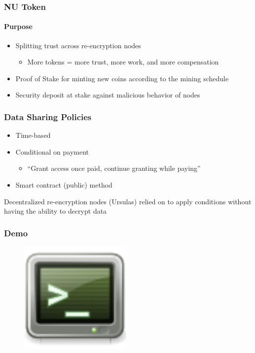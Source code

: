 \documentclass[xetex,mathsans,sans,aspectratio=169]{beamer}
\begin{document}
    \begin{frame}
        \frametitle{NU Token}
        \framesubtitle{Purpose}
        \begin{itemize}
            \item Splitting trust across re-encryption nodes 
            \begin{itemize}
              \item More tokens = more trust, more work, and more compensation
            \end{itemize}
            \item Proof of Stake for minting new coins according to the mining schedule
            \item Security deposit at stake against malicious behavior of nodes
        \end{itemize}
    \end{frame}

   \begin{frame}
        \frametitle{Data Sharing Policies}
        \begin{itemize}
            \item Time-based
            \item Conditional on payment 
            \begin{itemize}
              \item ``Grant access once paid, continue granting while paying''
            \end{itemize}
            \item Smart contract (public) method
        \end{itemize}
        Decentralized re-encryption nodes (Ursulas) relied on to apply conditions without having the ability to decrypt data
    \end{frame}

    \begin{frame}
        \frametitle{Demo}
        \begin{figure}
            \centering
            \includegraphics[height=5.5cm]{pdf/terminal.pdf}
        \end{figure}
    \end{frame}
\end{document}
